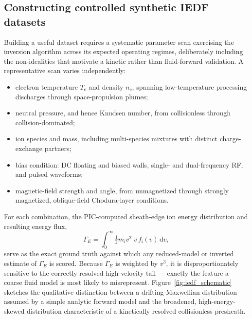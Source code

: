 \subsection{Constructing controlled synthetic IEDF datasets}

Building a useful dataset requires a systematic parameter scan exercising the inversion algorithm across its expected operating regimes, deliberately including the non-idealities that motivate a kinetic rather than fluid-forward validation. A representative scan varies independently:
\begin{itemize}
\item electron temperature $T_{\mathrm{e}}$ and density $n_{\mathrm{e}}$, spanning low-temperature processing discharges through space-propulsion plumes;
\item neutral pressure, and hence Knudsen number, from collisionless through collision-dominated;
\item ion species and mass, including multi-species mixtures with distinct charge-exchange partners;
\item bias condition: DC floating and biased walls, single- and dual-frequency RF, and pulsed waveforms;
\item magnetic-field strength and angle, from unmagnetized through strongly magnetized, oblique-field Chodura-layer conditions.
\end{itemize}
For each combination, the PIC-computed sheath-edge ion energy distribution and resulting energy flux,
\begin{equation}
\Gamma_{E} = \int_{0}^{\infty} \tfrac{1}{2} m_{\mathrm{i}} v^{2}\; v\, f_{\mathrm{i}}(v)\,\mathrm{d}v,
\end{equation}
serve as the exact ground truth against which any reduced-model or inverted estimate of $\Gamma_{E}$ is scored. Because $\Gamma_{E}$ is weighted by $v^{3}$, it is disproportionately sensitive to the correctly resolved high-velocity tail --- exactly the feature a coarse fluid model is most likely to misrepresent. Figure~\ref{fig:iedf_schematic} sketches the qualitative distinction between a drifting-Maxwellian distribution assumed by a simple analytic forward model and the broadened, high-energy-skewed distribution characteristic of a kinetically resolved collisionless presheath.

